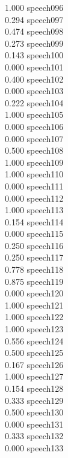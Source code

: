\documentclass[10pt]{article}
\begin{document}
\begin{enumerate}
\begin{enumerate}
\begin{multicols}{5}
            1.000 speech096\\
            0.294 speech097\\
            0.474 speech098\\
            0.273 speech099\\
            0.143 speech100\\
            0.000 speech101\\
            0.400 speech102\\
            0.000 speech103\\
            0.222 speech104\\
            1.000 speech105\\
            0.000 speech106\\
            0.000 speech107\\
            0.500 speech108\\
            1.000 speech109\\
            1.000 speech110\\
            0.000 speech111\\
            0.000 speech112\\
            1.000 speech113\\
            0.154 speech114\\
            0.000 speech115\\
            0.250 speech116\\
            0.250 speech117\\
            0.778 speech118\\
            0.875 speech119\\
            0.000 speech120\\
            1.000 speech121\\
            1.000 speech122\\
            1.000 speech123\\
            0.556 speech124\\
            0.500 speech125\\
            0.167 speech126\\
            1.000 speech127\\
            0.154 speech128\\
            0.333 speech129\\
            0.500 speech130\\
            0.000 speech131\\
            0.333 speech132\\
            0.000 speech133\\

\end{multicols}
\end{enumerate}
\end{enumerate}
\end{document}
